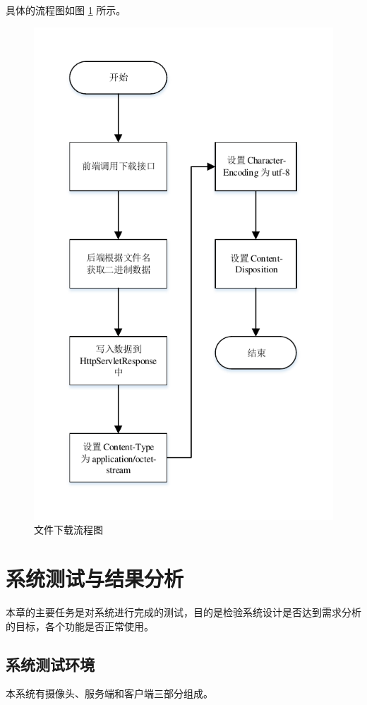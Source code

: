 具体的流程图如图 \ref{Fig:seq_download} 所示。

\begin{figure}[ht]
    \centering
    \includegraphics[width=0.9\linewidth]{./Figure/IMG_seq_download.pdf}
    \caption{文件下载流程图}\label{Fig:seq_download}
\end{figure}

\chapter{系统测试与结果分析}
本章的主要任务是对系统进行完成的测试，目的是检验系统设计是否达到需求分析的目标，各个功能是否正常使用。

\section{系统测试环境}
本系统有摄像头、服务端和客户端三部分组成。

